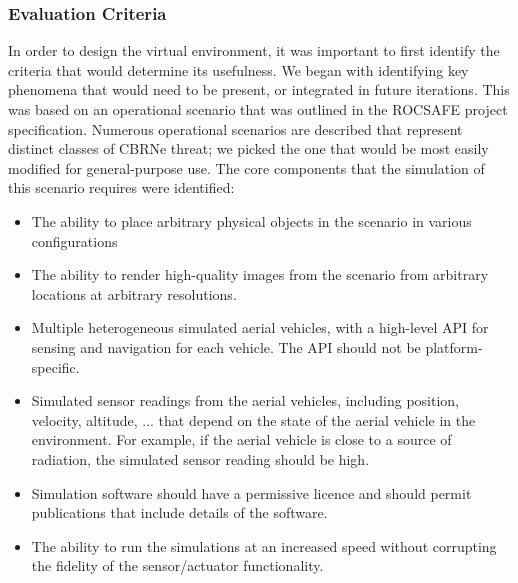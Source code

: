 
\subsubsection{Evaluation Criteria}
In order to design the virtual environment, it was important to first identify the criteria that would determine its usefulness. We began with identifying key phenomena that would need to be present, or integrated in future iterations. This was based on an operational scenario that was outlined in the ROCSAFE project specification\cite{rocsafeNUIG}. Numerous operational scenarios are described that represent distinct classes of CBRNe threat; we picked the one that would be most easily modified for general-purpose use. The core components that the simulation of this scenario requires were identified: 
\begin{itemize}
    \item The ability to place arbitrary physical objects in the scenario in various configurations
    \item The ability to render high-quality images from the scenario from arbitrary locations at arbitrary resolutions.
    \item Multiple heterogeneous simulated aerial vehicles, with a high-level API for sensing and navigation for each vehicle. The API should not be platform-specific.
    \item Simulated sensor readings from the aerial vehicles, including position, velocity, altitude, ... that depend on the state of the aerial vehicle in the environment. For example, if the aerial vehicle is close to a source of radiation, the simulated sensor reading should be high.
    \item Simulation software should have a permissive licence and should permit publications that include details of the software.
    \item The ability to run the simulations at an increased speed without corrupting the fidelity of the sensor/actuator functionality.
\end{itemize}

